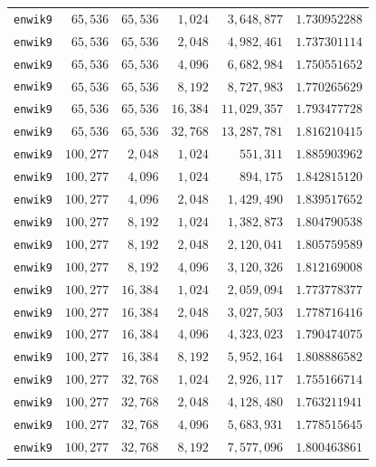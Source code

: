\begin{longtable}{lrrrrr}
\texttt{enwik9} & $65{,}536$ & $65{,}536$ & $1{,}024$ & $3{,}648{,}877$ & $1.730952288$ \\
\texttt{enwik9} & $65{,}536$ & $65{,}536$ & $2{,}048$ & $4{,}982{,}461$ & $1.737301114$ \\
\texttt{enwik9} & $65{,}536$ & $65{,}536$ & $4{,}096$ & $6{,}682{,}984$ & $1.750551652$ \\
\texttt{enwik9} & $65{,}536$ & $65{,}536$ & $8{,}192$ & $8{,}727{,}983$ & $1.770265629$ \\
\texttt{enwik9} & $65{,}536$ & $65{,}536$ & $16{,}384$ & $11{,}029{,}357$ & $1.793477728$ \\
\texttt{enwik9} & $65{,}536$ & $65{,}536$ & $32{,}768$ & $13{,}287{,}781$ & $1.816210415$ \\
\texttt{enwik9} & $100{,}277$ & $2{,}048$ & $1{,}024$ & $551{,}311$ & $1.885903962$ \\
\texttt{enwik9} & $100{,}277$ & $4{,}096$ & $1{,}024$ & $894{,}175$ & $1.842815120$ \\
\texttt{enwik9} & $100{,}277$ & $4{,}096$ & $2{,}048$ & $1{,}429{,}490$ & $1.839517652$ \\
\texttt{enwik9} & $100{,}277$ & $8{,}192$ & $1{,}024$ & $1{,}382{,}873$ & $1.804790538$ \\
\texttt{enwik9} & $100{,}277$ & $8{,}192$ & $2{,}048$ & $2{,}120{,}041$ & $1.805759589$ \\
\texttt{enwik9} & $100{,}277$ & $8{,}192$ & $4{,}096$ & $3{,}120{,}326$ & $1.812169008$ \\
\texttt{enwik9} & $100{,}277$ & $16{,}384$ & $1{,}024$ & $2{,}059{,}094$ & $1.773778377$ \\
\texttt{enwik9} & $100{,}277$ & $16{,}384$ & $2{,}048$ & $3{,}027{,}503$ & $1.778716416$ \\
\texttt{enwik9} & $100{,}277$ & $16{,}384$ & $4{,}096$ & $4{,}323{,}023$ & $1.790474075$ \\
\texttt{enwik9} & $100{,}277$ & $16{,}384$ & $8{,}192$ & $5{,}952{,}164$ & $1.808886582$ \\
\texttt{enwik9} & $100{,}277$ & $32{,}768$ & $1{,}024$ & $2{,}926{,}117$ & $1.755166714$ \\
\texttt{enwik9} & $100{,}277$ & $32{,}768$ & $2{,}048$ & $4{,}128{,}480$ & $1.763211941$ \\
\texttt{enwik9} & $100{,}277$ & $32{,}768$ & $4{,}096$ & $5{,}683{,}931$ & $1.778515645$ \\
\texttt{enwik9} & $100{,}277$ & $32{,}768$ & $8{,}192$ & $7{,}577{,}096$ & $1.800463861$ \\

\end{longtable}
